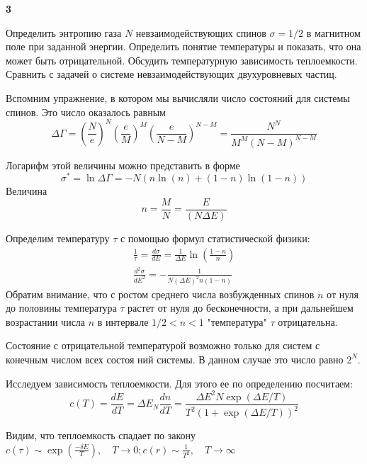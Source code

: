 \documentclass[a4paper,12pt]{article} %
\begin{document}
\begin{ttask} \textbf{3}

Определить энтропию газа $ N $ невзаимодействующих спинов  $\sigma= 1/2$ в магнитном поле при заданной энергии. 
Определить понятие температуры и показать, что она может быть отрицательной. 
Обсудить температурную зависимость теплоемкости. 
Сравнить с задачей о системе невзаимодействующих двухуровневых частиц.


Вспомним упражнение, в котором мы вычисляли число состояний для системы спинов. Это число оказалось равным
$$
\Delta \Gamma=\left(\frac{N}{e}\right)^{N}\left(\frac{e}{M}\right)^{M}\left(\frac{e}{N-M}\right)^{N-M}=\frac{N^{N}}{M^{M}(N-M)^{N-M}}
$$

Логарифм этой величины можно представить в форме
$$
\sigma^{*}=\ln \Delta \Gamma=-N(n \ln (n)+(1-n) \ln (1-n))
$$
Величина
$$
n=\frac{M}{N}=\frac{E}{(N \Delta E)}
$$

Определим температуру $\tau$  с помощью формул статистической физики:
$$
\begin{array}{l}
\frac{1}{\tau}=\frac{d \sigma}{d E}=\frac{1}{\Delta E} \ln \left(\frac{1-n}{n}\right) \\
\frac{d^{2} \sigma}{d E^{2}}=-\frac{1}{N(\Delta E)^{2} n(1-n)}
\end{array}
$$
Обратим внимание, что с ростом среднего числа возбужденных спинов $n$ от нуля до половины температура $\tau$ растет от нуля до бесконечности, а при дальнейшем возрастании числа $n$ в интервале $1 / 2<n<1$ "температура" $\tau$ отрицательна. 

Состояние с отрицательной температурой возможно только для систем с конечным числом всех состоя ний системы. 
В данном случае это число равно $2^{N}$.


Исследуем зависимость теплоемкости. Для этого ее по определению посчитаем:
\[ c(T)=\frac{d E}{d T}=\Delta E_{N} \frac{d n}{d T}= \frac{\Delta E^{2} N \exp (\Delta E /T)}{T^{2}(1+\exp(\Delta E / T))^{2}} \]

Видим, что теплоемкость спадает по закону $ c(\tau) \sim \operatorname{exp}\left(\frac{-\delta E}{T}\right), \quad T \rightarrow 0; c(r) \sim \frac{1}{T^{2}}, \quad T \rightarrow \infty$


\end{ttask}
\end{document}
